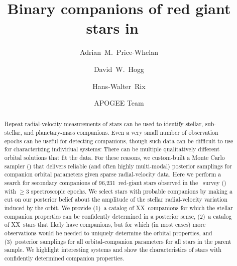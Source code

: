 \documentclass[modern, letterpaper]{aastex62}
\newcommand{\apogee}{\project{\acronym{APOGEE}}}
\newcommand{\thejoker}{\project{The~Joker}}
\newcommand{\DR}{\acronym{DR14}}
\newcommand{\nstars}{96,231}
\newcommand{\nunimodal}{XX}
\newcommand{\nmultimodal}{XX}
\begin{document}
\sloppy\sloppypar\raggedbottom\frenchspacing %

\title{Binary companions of red giant stars in \apogee\ \DR}

\author[0000-0003-0872-7098]{Adrian~M.~Price-Whelan}

\author[0000-0003-2866-9403]{David~W.~Hogg}

\author[0000-0003-4996-9069]{Hans-Walter~Rix}

\author{APOGEE Team}

\begin{abstract}\noindent %
Repeat radial-velocity measurements of stars can be used to identify stellar,
sub-stellar, and planetary-mass companions.
Even a very small number of observation epochs can be useful for detecting
companions, though such data can be difficult to use for characterizing
individual systems:
There can be multiple qualitatively different orbital solutions that fit the
data.
For these reasons, we custom-built a Monte Carlo sampler (\thejoker) that
delivers reliable (and often highly multi-modal) posterior samplings for
companion orbital parameters given sparse radial-velocity data.
Here we perform a search for secondary companions of \nstars\ red-giant stars
observed in the \apogee\ survey (\DR) with $\geq 3$ spectroscopic epochs.
We select stars with probable companions by making a cut on our posterior belief
about the amplitude of the stellar radial-velocity variation induced by the
orbit.
We provide (1)~a catalog of \nunimodal\ companions for which the stellar
companion properties can be confidently determined in a posterior sense, (2)~a
catalog of \nmultimodal\ stars that likely have companions, but for which
(in most cases) more observations would be needed to uniquely determine the
orbital properties, and (3)~posterior samplings for all orbital-companion
parameters for all stars in the parent sample.
We highlight interesting systems and show the characteristics of stars with
confidently determined companion properties.
\end{abstract}
\end{document}
